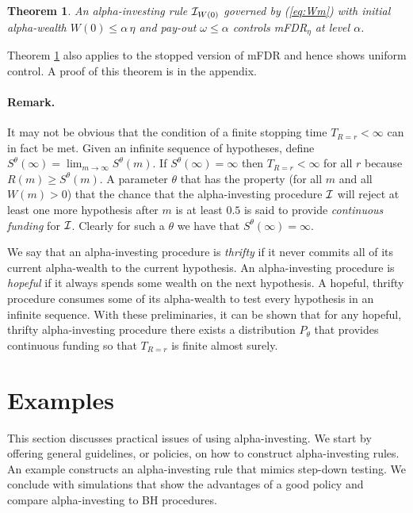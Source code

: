 \documentclass[12pt]{article}
\newtheorem{theorem}{Theorem}
\newcommand{\eqn}[1]{(\ref{#1})}
\begin{document}
\begin{theorem} \label{th:main} An alpha-investing rule ${\cal
 I}_{W(0)}$ governed by \eqn{eq:Wm} with initial alpha-wealth
 $W(0) \le \alpha \, \eta$ and pay-out $\omega \le \alpha$ controls
 mFDR$_\eta$ at level $\alpha$.
\label{eq:theorem1}
\end{theorem}
Theorem \ref{th:main} also applies to the stopped version of mFDR and
 hence shows uniform control.  A proof of this theorem is in the
 appendix.


\paragraph{Remark.} 
It may not be obvious that the condition of a finite stopping time
 $T_{R=r} < \infty$ can in
 fact be met. Given an infinite sequence of hypotheses, define 
 $S^\theta(\infty) = \lim_{m \to \infty} S^\theta(m)$. 
If $S^\theta(\infty) = \infty$ then $T_{R=r} < \infty$ for all $r$ because
 $R(m) \ge S^\theta(m)$.   A parameter $\theta$ 
 that has the property (for all $m$ and all $W(m) > 0$) that
 the chance that the alpha-investing procedure $\cal I$ will reject at
 least one more hypothesis after $m$ is at least $0.5$ is said to
provide  {\em continuous funding} for $\cal I$.  Clearly for such a
 $\theta$ we have that $S^\theta(\infty) = \infty$.

We say that an alpha-investing procedure is {\em thrifty} if it
 never commits all of its current alpha-wealth to the current hypothesis. An
  alpha-investing procedure is {\em hopeful} if it
 always spends  some  wealth on the next hypothesis.  A
 hopeful, thrifty procedure consumes some of its alpha-wealth to test
 every hypothesis in an infinite sequence. With these preliminaries, it
 can be shown that
for any hopeful, thrifty alpha-investing procedure there exists a
distribution $P_\theta$ that provides continuous funding so that $T_{R=r}$
is finite almost surely.


\section{Examples}              \label{sec:examples}           %

This section discusses practical issues of using 
 alpha-investing.  We start by offering general guidelines, or policies,
 on how to construct alpha-investing rules. An example constructs an 
 alpha-investing rule that mimics step-down testing. We conclude with
 simulations that show the advantages of a good policy and compare
 alpha-investing to BH procedures.
\end{document}
